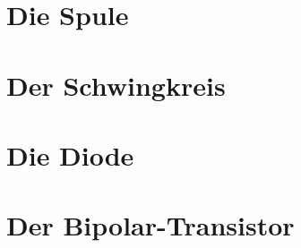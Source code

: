 \documentclass[ngerman,openany]{Script}
\begin{document}


\newpage
\chapter{Die Spule}


\chapter{Der Schwingkreis}


\chapter{Die Diode}


\chapter{Der Bipolar-Transistor}



\end{document}
